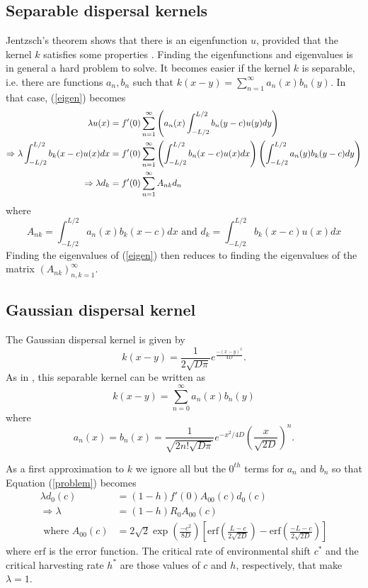 \documentclass[12pt,english]{article}
\begin{document}
\subsection{Separable dispersal kernels \label{sep}}
Jentzsch's theorem shows that there is an eigenfunction $u$, provided that the kernel $k$ satisfies some properties \citep{ZhouKot2011}.  Finding the eigenfunctions and eigenvalues is in general a hard problem to solve.  It becomes easier if the kernel $k$ is separable, i.e. there are functions $a_n,b_n$ such that $k(x-y)=\sum_{n=1}^\infty a_n(x)b_n(y)$.  In that case, (\ref{eigen}) becomes
\begin{align}
\lambda u(x)&=f'(0)\sum_{n=1}^\infty\left( a_n(x)\int_{-L/2}^{L/2}b_n(y-c)u(y)dy\right) \notag
\\ \Rightarrow \lambda\int_{-L/2}^{L/2}b_k(x-c)u(x)dx&=f'(0)\sum_{n=1}^{\infty}\left(\int_{-L/2}^{L/2}b_n(x-c)u(x)dx\right)\left(\int_{-L/2}^{L/2}a_n(y)b_k(y-c)dy\right) \notag
\\ \Rightarrow \lambda d_k&=f'(0)\sum_{n=1}^\infty A_{nk}d_n  \label{problem}
\end{align}
where
\begin{equation*}
A_{nk}=\int_{-L/2}^{L/2}a_n(x)b_k(x-c)dx \text{ and } d_k=\int_{-L/2}^{L/2}b_k(x-c)u(x)dx
\end{equation*}
Finding the eigenvalues of (\ref{eigen}) then reduces to finding the eigenvalues of the matrix $(A_{nk})_{n,k=1}^\infty$.

\subsection{Gaussian dispersal kernel \label{gausapp}}
The Gaussian dispersal kernel is given by
$$k(x-y)=\frac{1}{2\sqrt{D\pi}}e^{\frac{-(x-y)^2}{4D}}.$$
As in \citep{Latore:1998fk}, this separable kernel can be written as
$$k(x-y)=\sum_{n=0}^\infty a_n(x)b_n(y)$$
where
$$a_n(x)=b_n(x)=\frac{1}{\sqrt{2n!\sqrt{D\pi}}}e^{-x^2/4D}\left(\frac{x}{\sqrt{2D}}\right)^n.$$

As a first approximation to $k$ we ignore all but the $0^{th}$ terms for $a_n$ and $b_n$ so that Equation (\ref{problem}) becomes
\begin{align*}
\lambda d_0(c)&=(1-h)f'(0)A_{00}(c)d_0(c)
\\ \Rightarrow \lambda&=(1-h)R_0A_{00}(c)
\\\text{ where } A_{00}(c)&=2\sqrt{2}\exp\left(\frac{-c^2}{8D}\right)\left[\text{erf}\left(\frac{L-c}{2\sqrt{2D}}\right)-\text{erf}\left(\frac{-L-c}{2\sqrt{2D}}\right)\right]
\end{align*}
where $\text{erf}$ is the error function.  The critical rate of environmental shift $c^*$ and the critical harvesting rate $h^*$ are those values of $c$ and $h$, respectively, that make $\lambda=1$.
\end{document}
